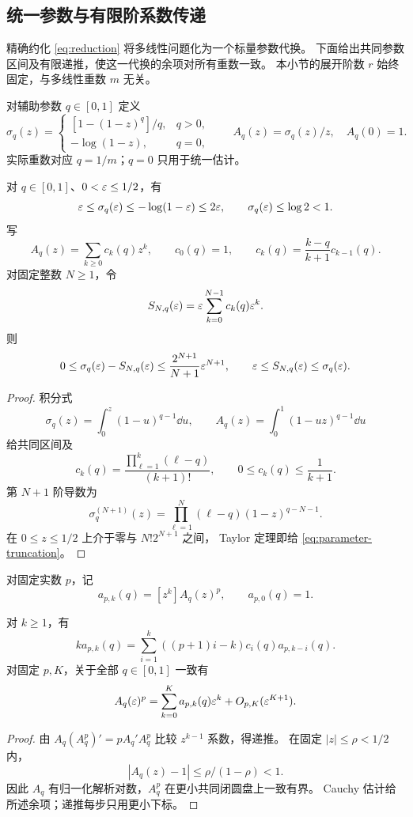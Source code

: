 \subsection{统一参数与有限阶系数传递}

精确约化 \eqref{eq:reduction} 将多线性问题化为一个标量参数代换。
下面给出共同参数区间及有限递推，使这一代换的余项对所有重数一致。
本小节的展开阶数 \(r\) 始终固定，与多线性重数 \(m\) 无关。

对辅助参数 \(q\in[0,1]\) 定义
\[
 \sigma_q(z)=
 \begin{cases}[1-(1-z)^q]/q,&q>0,\\-\log(1-z),&q=0,\end{cases}
 \qquad A_q(z)=\sigma_q(z)/z,\quad A_q(0)=1.
\]
实际重数对应 \(q=1/m\)；\(q=0\) 只用于统一估计。
\begin{lemma}[共同参数区间与截断]\label{lem:parameter}
对 \(q\in[0,1]\)、\(0<\varepsilon\le1/2\)，有
\begin{equation}\label{eq:uniformparameter}
 \varepsilon\le\sigma_q(\varepsilon)\le-\log(1-\varepsilon)\le2\varepsilon,\qquad
 \sigma_q(\varepsilon)\le\log2<1.
\end{equation}
写
\[
 A_q(z)=\sum_{k\ge0}c_k(q)z^k,\qquad
 c_0(q)=1,\qquad
 c_k(q)=\frac{k-q}{k+1}c_{k-1}(q).
\]
对固定整数 \(N\ge1\)，令
\[
 S_{N,q}(\varepsilon)=\varepsilon\sum_{k=0}^{N-1}c_k(q)\varepsilon^k.
\]
则
\begin{equation}\label{eq:parameter-truncation}
 0\le\sigma_q(\varepsilon)-S_{N,q}(\varepsilon)
 \le\frac{2^{N+1}}{N+1}\varepsilon^{N+1},\qquad
 \varepsilon\le S_{N,q}(\varepsilon)\le\sigma_q(\varepsilon).
\end{equation}
\end{lemma}
\begin{proof}
积分式
\[
 \sigma_q(z)=\int_0^z(1-u)^{q-1}\dd u,\qquad
 A_q(z)=\int_0^1(1-uz)^{q-1}\dd u
\]
给共同区间及
\[
 c_k(q)=\frac{\prod_{\ell=1}^k(\ell-q)}{(k+1)!},
 \qquad0\le c_k(q)\le\frac1{k+1}.
\]
第 \(N+1\) 阶导数为
\[
 \sigma_q^{(N+1)}(z)
 =\prod_{\ell=1}^N(\ell-q)(1-z)^{q-N-1}.
\]
在 \(0\le z\le1/2\) 上介于零与 \(N!2^{N+1}\) 之间，
Taylor 定理即给 \eqref{eq:parameter-truncation}。
\end{proof}

对固定实数 \(p\)，记
\[
 a_{p,k}(q)=[z^k]A_q(z)^p,\qquad a_{p,0}(q)=1.
\]
\begin{lemma}[参数幂的有限递推]\label{lem:composition}
对 \(k\ge1\)，有
\begin{equation}\label{eq:composition-recursion}
 k a_{p,k}(q)=
 \sum_{i=1}^k((p+1)i-k)c_i(q)a_{p,k-i}(q).
\end{equation}
对固定 \(p,K\)，关于全部 \(q\in[0,1]\) 一致有
\[
 A_q(\varepsilon)^p=\sum_{k=0}^K a_{p,k}(q)\varepsilon^k
                      +O_{p,K}(\varepsilon^{K+1}).
\]
\end{lemma}
\begin{proof}
由 \(A_q(A_q^p)'=pA_q'A_q^p\) 比较 \(z^{k-1}\) 系数，得递推。
在固定 \(|z|\le\rho<1/2\) 内，
\[
 |A_q(z)-1|\le\rho/(1-\rho)<1.
\]
因此 \(A_q\) 有归一化解析对数，\(A_q^p\) 在更小共同闭圆盘上一致有界。
Cauchy 估计给所述余项；递推每步只用更小下标。
\end{proof}

